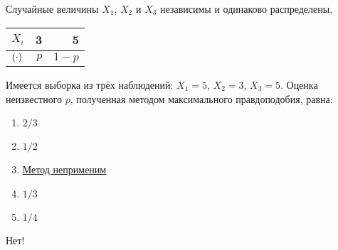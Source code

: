 \documentclass[t]{beamer}
\let\P\relax
\DeclareMathOperator{\P}{\mathbb{P}}
\begin{document}
 \begin{frame} \label{32-No} 
\begin{block}{32} 

  Случайные величины $X_1$, $X_2$ и $X_3$ независимы и одинаково распределены,

\begin{center}
  \begin{tabular}{lrr} \toprule
  $X_i$ & 3 & 5 \\
  \midrule
  $\P(\cdot)$ & $p$ & $1-p$ \\
  \bottomrule
  \end{tabular}
\end{center}

  Имеется выборка из трёх наблюдений: $X_1=5$, $X_2=3$, $X_3=5$. Оценка неизвестного $p$, полученная методом максимального правдоподобия, равна:


  


 \end{block} 
\begin{enumerate} 
\item[] \hyperlink{32-No}{\beamergotobutton{} $2/3$}
\item[] \hyperlink{32-No}{\beamergotobutton{} $1/2$}
\item[] \hyperlink{32-No}{\beamergotobutton{} Метод неприменим}
\item[] \hyperlink{32-Yes}{\beamergotobutton{} $1/3$}
\item[] \hyperlink{32-No}{\beamergotobutton{} $1/4$}
\end{enumerate} 

 \alert{Нет!} 
\end{frame} 
\end{document}
